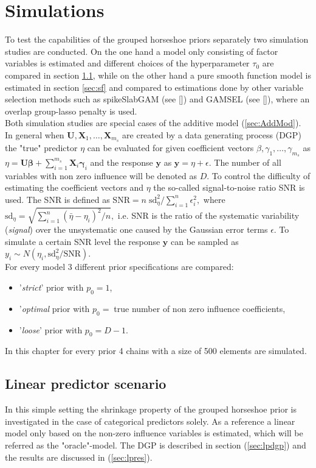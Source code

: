 \documentclass[12pt,letterpaper]{article}
\numberwithin{equation}{subsection}
\begin{document}
\section{Simulations}
\label{sec:sim}
To test the capabilities of the grouped horseshoe priors separately two simulation studies are conducted. On the one hand a model only consisting of factor variables is estimated and different choices of the hyperparameter $\tau_0$ are compared in section \ref{sec:lp}, while on the other hand a pure smooth function model is estimated in section \ref{sec:sf} and compared to estimations done by other variable selection methods such as spikeSlabGAM (see [\cite{scheipl}]) and GAMSEL (see [\cite{gamsel}]), where an overlap group-lasso penalty is used. \\
Both simulation studies are special cases of the additive model (\ref{sec:AddMod}). In general when $\mathbf{U}, \mathbf{X}_1,\dots ,\mathbf{X}_{m_s}$ are created by a data generating process (DGP) the "true" predictor $\eta$ can be evaluated for given coefficient vectors $\beta, \gamma_1 ,\dots ,\gamma_{m_s}$ as $\eta = \mathbf{U}\mathbf{\beta} +  \sum^{m_s}_{i=1} \mathbf{X}_i\mathbf{\gamma}_i$ and the response $\mathbf{y}$ as $\mathbf{y} = \eta + \epsilon$. The number of all variables with non zero influence will be denoted as $D$. To control the difficulty of estimating the coefficient vectors and $\eta$ the so-called signal-to-noise ratio SNR is used. The SNR is defined as $\text{SNR} = n \;\text{sd}^2_\eta / \sum^n_{i=1}\epsilon^2_i,$ where $\text{sd}_\eta = \sqrt{\sum^n_{i=1}(\bar{\eta} -\eta_i)^2/n},$ i.e. SNR is the ratio of the systematic variability (\textit{signal}) over the unsystematic one caused by the Gaussian error terms $\epsilon$.
To simulate a certain SNR level the response $\mathbf{y}$ can be sampled as $y_i \sim N(\eta_i , \text{sd}_\eta^2 / \text{SNR})$. \\
For every model 3 different prior specifications are compared:
\begin{itemize}
\item '\textit{strict}' prior with $p_0 = 1$,
\item '\textit{optimal} prior with $p_0 = \;$true number of non zero influence coefficients,
\item '\textit{loose}' prior with $p_0 = D-1$.
\end{itemize}
In this chapter for every prior 4 chains with a size of 500 elements are simulated.
\newpage
\subsection{Linear predictor scenario}
\label{sec:lp}
In this simple setting the shrinkage property of the grouped horseshoe prior is investigated in the case of categorical predictors solely. As a reference a linear model only based on the non-zero influence variables is estimated, which will be referred as the "oracle"-model. The DGP is described in section (\ref{sec:lpdgp}) and the results are discussed in (\ref{sec:lpres}).
\end{document}
